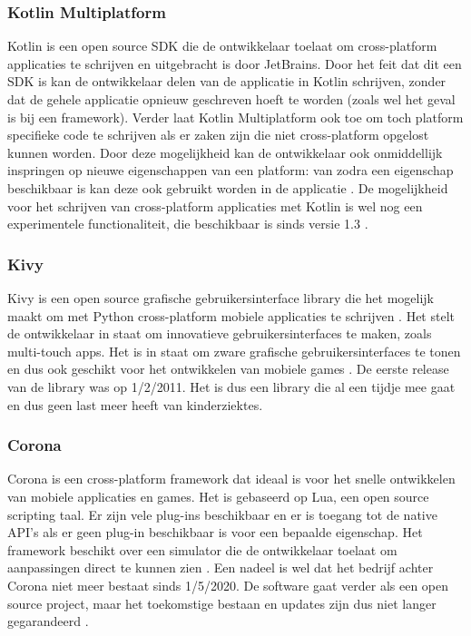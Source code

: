 \subsubsection{Kotlin Multiplatform}
\label{subsubsec:Kotlin}

Kotlin is een open source SDK die de ontwikkelaar toelaat om cross-platform applicaties te schrijven en uitgebracht is door JetBrains. Door het feit dat dit een SDK is kan de ontwikkelaar delen van de applicatie in Kotlin schrijven, zonder dat de gehele applicatie opnieuw geschreven hoeft te worden (zoals wel het geval is bij een framework). Verder laat Kotlin Multiplatform ook toe om toch platform specifieke code te schrijven als er zaken zijn die niet cross-platform opgelost kunnen worden. Door deze mogelijkheid kan de ontwikkelaar ook onmiddellijk inspringen op nieuwe eigenschappen van een platform: van zodra een eigenschap beschikbaar is kan deze ook gebruikt worden in de applicatie \autocite{JetBrains2020}. De mogelijkheid voor het schrijven van cross-platform applicaties met Kotlin is wel nog een experimentele functionaliteit, die beschikbaar is sinds versie 1.3 \autocite{Belov2018}.


\subsubsection{Kivy}
\label{subsubsec:Kivy}

Kivy is een open source grafische gebruikersinterface library die het mogelijk maakt om met Python cross-platform mobiele applicaties te schrijven \autocite{Vasilkov2015}. Het stelt de ontwikkelaar in staat om innovatieve gebruikersinterfaces te maken, zoals multi-touch apps. Het is in staat om zware grafische gebruikersinterfaces te tonen en dus ook geschikt voor het ontwikkelen van mobiele games \autocite{Kivy2020}. De eerste release van de library was op 1/2/2011. Het is dus een library die al een tijdje mee gaat en dus geen last meer heeft van kinderziektes.

\subsubsection{Corona}
\label{subsubsec:Corona}

Corona is een cross-platform framework dat ideaal is voor het snelle ontwikkelen van mobiele applicaties en games. Het is gebaseerd op Lua, een open source scripting taal. Er zijn vele plug-ins beschikbaar en er is toegang tot de native API's als er geen plug-in beschikbaar is voor een bepaalde eigenschap. Het framework beschikt over een simulator die de ontwikkelaar toelaat om aanpassingen direct te kunnen zien \autocite{Coronalabs2020}. Een nadeel is wel dat het bedrijf achter Corona niet meer bestaat sinds 1/5/2020. De software gaat verder als een open source project, maar het toekomstige bestaan en updates zijn dus niet langer gegarandeerd \autocite{Shcherban2020}.


